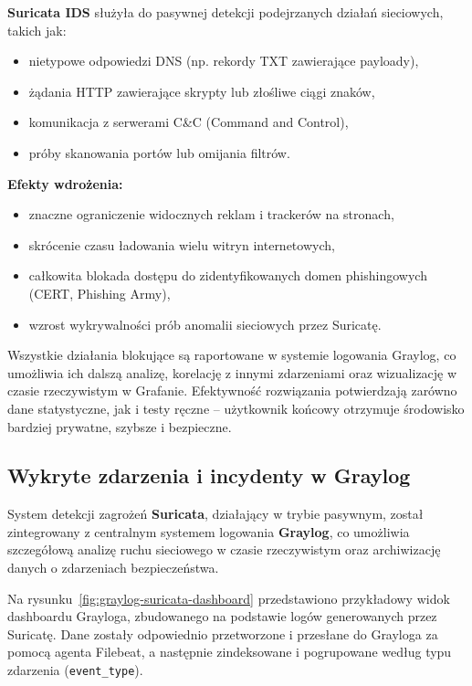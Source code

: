 \documentclass[
    left=2.5cm,         %
    right=2.5cm,        %
    top=2.5cm,          %
    bottom=3cm,         %
    bindingoffset=6mm,  %
    nohyphenation=true %
]{eiti/eiti-thesis} %
\begin{document}
\textbf{Suricata IDS} służyła do pasywnej detekcji podejrzanych działań sieciowych, takich jak:
\begin{itemize}
    \item nietypowe odpowiedzi DNS (np. rekordy TXT zawierające payloady),
    \item żądania HTTP zawierające skrypty lub złośliwe ciągi znaków,
    \item komunikacja z serwerami C\&C (Command and Control),
    \item próby skanowania portów lub omijania filtrów.
\end{itemize}

\textbf{Efekty wdrożenia:}
\begin{itemize}
    \item znaczne ograniczenie widocznych reklam i trackerów na stronach,
    \item skrócenie czasu ładowania wielu witryn internetowych,
    \item całkowita blokada dostępu do zidentyfikowanych domen phishingowych (CERT, Phishing Army),
    \item wzrost wykrywalności prób anomalii sieciowych przez Suricatę.
\end{itemize}

Wszystkie działania blokujące są raportowane w systemie logowania Graylog, co umożliwia ich dalszą analizę, korelację z innymi zdarzeniami oraz wizualizację w czasie rzeczywistym w Grafanie. Efektywność rozwiązania potwierdzają zarówno dane statystyczne, jak i testy ręczne – użytkownik końcowy otrzymuje środowisko bardziej prywatne, szybsze i bezpieczne.

\subsection{Wykryte zdarzenia i incydenty w Graylog}

System detekcji zagrożeń \textbf{Suricata}, działający w trybie pasywnym, został zintegrowany z centralnym systemem logowania \textbf{Graylog}, co umożliwia szczegółową analizę ruchu sieciowego w czasie rzeczywistym oraz archiwizację danych o zdarzeniach bezpieczeństwa.

Na rysunku~\ref{fig:graylog-suricata-dashboard} przedstawiono przykładowy widok dashboardu Grayloga, zbudowanego na podstawie logów generowanych przez Suricatę. Dane zostały odpowiednio przetworzone i przesłane do Grayloga za pomocą agenta Filebeat, a następnie zindeksowane i pogrupowane według typu zdarzenia (\texttt{event\_type}).
\end{document}
